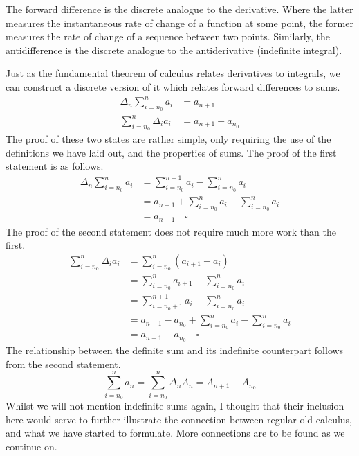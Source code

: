 \documentclass[a4paper]{article}
\theoremstyle{definition}
\begin{document}
The forward difference is the discrete analogue to the derivative.
Where the latter measures the instantaneous rate of change of a function at some point, the former measures the rate of change of a sequence between two points.
Similarly, the antidifference is the discrete analogue to the antiderivative (indefinite integral).

Just as the fundamental theorem of calculus relates derivatives to integrals, we can construct a discrete version of it which relates forward differences to sums.
\begin{align}
    \Delta_n \sum_{i=n_0}^{n} a_i & = a_{n+1} \label{DFTC1}           \\
    \sum_{i=n_0}^n \Delta_i a_i   & = a_{n+1} - a_{n_0} \label{DFTC2}
\end{align}
The proof of these two states are rather simple, only requiring the use of the definitions we have laid out, and the properties of sums.
The proof of the first statement is as follows.
\begin{align*}
    \Delta_n \sum_{i=n_0}^{n} a_i & = \sum_{i=n_0}^{n+1} a_i - \sum_{i=n_0}^{n} a_i         \\
                                  & = a_{n+1} + \sum_{i=n_0}^{n} a_i - \sum_{i=n_0}^{n} a_i \\
                                  & = a_{n+1} \quad \square
\end{align*}
The proof of the second statement does not require much more work than the first.
\begin{align*}
    \sum_{i=n_0}^n \Delta_i a_i & = \sum_{i=n_0}^n (a_{i+1} - a_i)                                \\
                                & = \sum_{i=n_0}^n a_{i+1} - \sum_{i=n_0}^n a_i                   \\
                                & = \sum_{i=n_0+1}^{n+1} a_i - \sum_{i=n_0}^n a_i                 \\
                                & = a_{n+1} - a_{n_0} + \sum_{i=n_0}^{n} a_i - \sum_{i=n_0}^n a_i \\
                                & = a_{n+1} - a_{n_0} \quad \square
\end{align*}
The relationship between the definite sum and its indefinite counterpart follows from the second statement.
\begin{equation}
    \sum_{i=n_0}^n a_n = \sum_{i=n_0}^n \Delta_n A_n = A_{n+1} - A_{n_0}
\end{equation}
Whilst we will not mention indefinite sums again, I thought that their inclusion here would serve to further illustrate the connection between regular old calculus, and what we have started to formulate.
More connections are to be found as we continue on.
\end{document}
